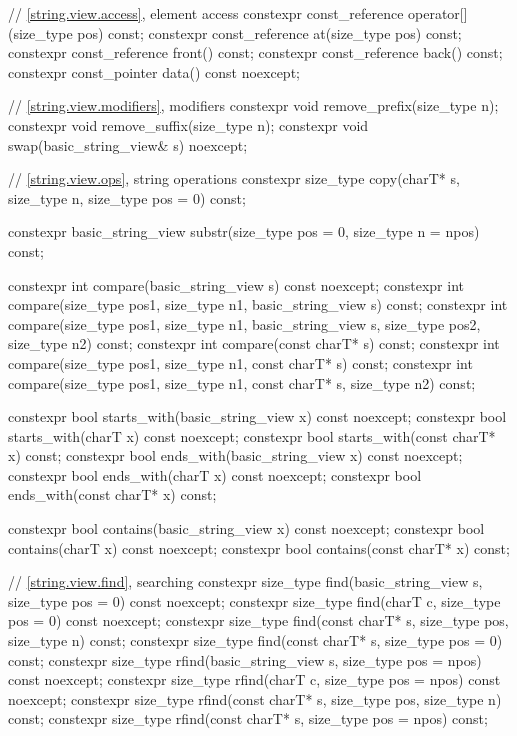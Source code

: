 \begin{codeblock}
{{    // \ref{string.view.access}, element access
    constexpr const_reference operator[](size_type pos) const;
    constexpr const_reference at(size_type pos) const;
    constexpr const_reference front() const;
    constexpr const_reference back() const;
    constexpr const_pointer data() const noexcept;

    // \ref{string.view.modifiers}, modifiers
    constexpr void remove_prefix(size_type n);
    constexpr void remove_suffix(size_type n);
    constexpr void swap(basic_string_view& s) noexcept;

    // \ref{string.view.ops}, string operations
    constexpr size_type copy(charT* s, size_type n, size_type pos = 0) const;

    constexpr basic_string_view substr(size_type pos = 0, size_type n = npos) const;

    constexpr int compare(basic_string_view s) const noexcept;
    constexpr int compare(size_type pos1, size_type n1, basic_string_view s) const;
    constexpr int compare(size_type pos1, size_type n1, basic_string_view s,
                          size_type pos2, size_type n2) const;
    constexpr int compare(const charT* s) const;
    constexpr int compare(size_type pos1, size_type n1, const charT* s) const;
    constexpr int compare(size_type pos1, size_type n1, const charT* s, size_type n2) const;

    constexpr bool starts_with(basic_string_view x) const noexcept;
    constexpr bool starts_with(charT x) const noexcept;
    constexpr bool starts_with(const charT* x) const;
    constexpr bool ends_with(basic_string_view x) const noexcept;
    constexpr bool ends_with(charT x) const noexcept;
    constexpr bool ends_with(const charT* x) const;

    constexpr bool contains(basic_string_view x) const noexcept;
    constexpr bool contains(charT x) const noexcept;
    constexpr bool contains(const charT* x) const;

    // \ref{string.view.find}, searching
    constexpr size_type find(basic_string_view s, size_type pos = 0) const noexcept;
    constexpr size_type find(charT c, size_type pos = 0) const noexcept;
    constexpr size_type find(const charT* s, size_type pos, size_type n) const;
    constexpr size_type find(const charT* s, size_type pos = 0) const;
    constexpr size_type rfind(basic_string_view s, size_type pos = npos) const noexcept;
    constexpr size_type rfind(charT c, size_type pos = npos) const noexcept;
    constexpr size_type rfind(const charT* s, size_type pos, size_type n) const;
    constexpr size_type rfind(const charT* s, size_type pos = npos) const;

}}
\end{codeblock}
